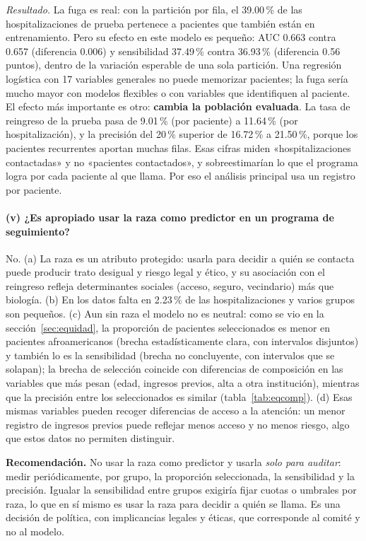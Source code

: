 \documentclass[11pt,a4paper]{article}
\begin{document}
\emph{Resultado.} La fuga es real: con la partición por fila, el 39.00\,\% de las hospitalizaciones de prueba pertenece a pacientes que también están en entrenamiento. Pero su efecto en este modelo es pequeño: AUC 0.663 contra 0.657 (diferencia 0.006) y sensibilidad 37.49\,\% contra 36.93\,\% (diferencia 0.56 puntos), dentro de la variación esperable de una sola partición. Una regresión logística con 17 variables generales no puede memorizar pacientes; la fuga sería mucho mayor con modelos flexibles o con variables que identifiquen al paciente. El efecto más importante es otro: \textbf{cambia la población evaluada}. La tasa de reingreso de la prueba pasa de 9.01\,\% (por paciente) a 11.64\,\% (por hospitalización), y la precisión del 20\,\% superior de 16.72\,\% a 21.50\,\%, porque los pacientes recurrentes aportan muchas filas. Esas cifras miden «hospitalizaciones contactadas» y no «pacientes contactados», y sobreestimarían lo que el programa logra por cada paciente al que llama. Por eso el análisis principal usa un registro por paciente.

\paragraph{(v) ¿Es apropiado usar la raza como predictor en un programa de seguimiento?}
No. (a) La raza es un atributo protegido: usarla para decidir a quién se contacta puede producir trato desigual y riesgo legal y ético, y su asociación con el reingreso refleja determinantes sociales (acceso, seguro, vecindario) más que biología. (b) En los datos falta en 2.23\,\% de las hospitalizaciones y varios grupos son pequeños. (c) Aun sin raza el modelo no es neutral: como se vio en la sección~\ref{sec:equidad}, la proporción de pacientes seleccionados es menor en pacientes afroamericanos (brecha estadísticamente clara, con intervalos disjuntos) y también lo es la sensibilidad (brecha no concluyente, con intervalos que se solapan); la brecha de selección coincide con diferencias de composición en las variables que más pesan (edad, ingresos previos, alta a otra institución), mientras que la precisión entre los seleccionados es similar (tabla~\ref{tab:eqcomp}). (d) Esas mismas variables pueden recoger diferencias de acceso a la atención: un menor registro de ingresos previos puede reflejar menos acceso y no menos riesgo, algo que estos datos no permiten distinguir.

\textbf{Recomendación.} No usar la raza como predictor y usarla \emph{solo para auditar}: medir periódicamente, por grupo, la proporción seleccionada, la sensibilidad y la precisión. Igualar la sensibilidad entre grupos exigiría fijar cuotas o umbrales por raza, lo que en sí mismo es usar la raza para decidir a quién se llama. Es una decisión de política, con implicancias legales y éticas, que corresponde al comité y no al modelo.
\end{document}
